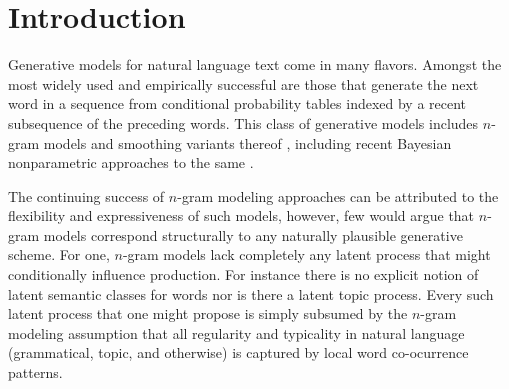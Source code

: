 \section{Introduction}


Generative models for natural language text come in many flavors.  Amongst the most widely used and empirically successful are those that  generate the next word in a sequence from conditional probability tables indexed by a recent subsequence of the preceding words.  This class of generative models includes $n$-gram models  and smoothing variants thereof \cite{Kneser1995,MacKay1995a,Chen1998}, including recent Bayesian nonparametric approaches to the same \cite{Teh2006a,Wood2009}.  

The continuing success of $n$-gram modeling approaches can be attributed to the flexibility and expressiveness of such models, however, few would argue that $n$-gram models correspond structurally to any naturally plausible generative scheme.   For one, $n$-gram models lack completely any latent process that might conditionally influence production.  For instance there is no explicit notion of latent semantic classes for words nor is there a latent topic process.  Every such latent process that one might propose is simply subsumed by the $n$-gram modeling assumption that all regularity and typicality in natural language (grammatical, topic, and otherwise) is captured by local word co-ocurrence patterns.  


